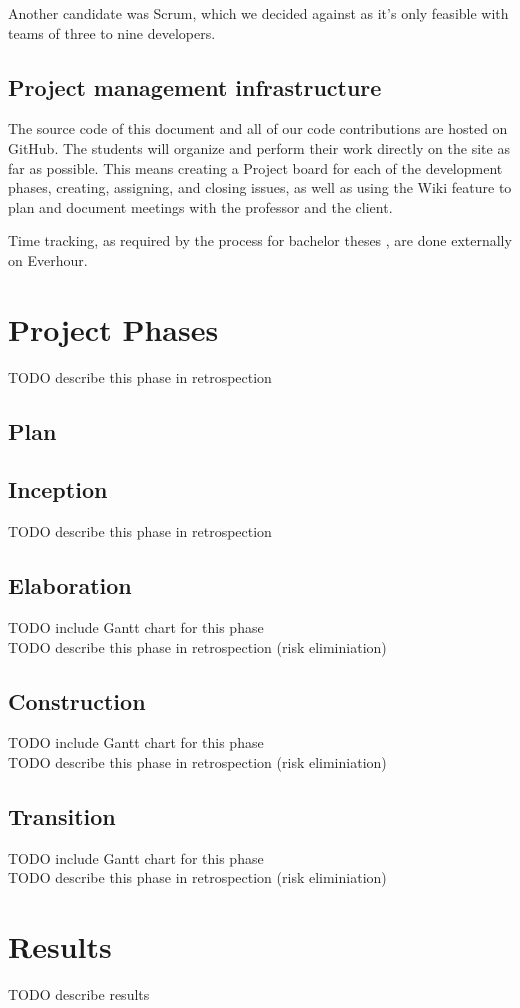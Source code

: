 Another candidate was Scrum, which we decided against as it’s only feasible
with teams of three to nine developers.

\section{Project management infrastructure}
The source code of this document and all of our code contributions are hosted
on GitHub. The students will organize and perform their work directly on the
site as far as possible. This means creating a Project board for each of the
development phases, creating, assigning, and closing issues, as well as using
the Wiki feature to plan and document meetings with the professor and the
client.

Time tracking, as required by the process for bachelor theses
\cite{hsr:thesis-rules}, are done externally on Everhour.


\chapter{Project Phases}
TODO describe this phase in retrospection\\


\section{Plan}

\section{Inception}
TODO describe this phase in retrospection\\

\section{Elaboration}
TODO include Gantt chart for this phase\\
TODO describe this phase in retrospection (risk eliminiation)\\

\section{Construction}
TODO include Gantt chart for this phase\\
TODO describe this phase in retrospection (risk eliminiation)\\

\section{Transition}
TODO include Gantt chart for this phase\\
TODO describe this phase in retrospection (risk eliminiation)\\

\chapter{Results}
TODO describe results\\
